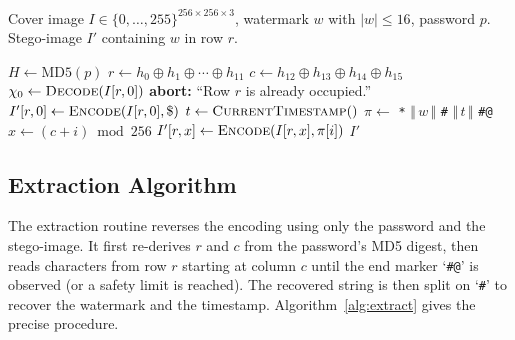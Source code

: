 \begin{algorithm}[H]
    \RaggedRight
    \caption{Row-based LSB watermark embedding}
    \label{alg:embed}
    \algorithmicrequire \quad Cover image $I \in \{0,\ldots,255\}^{256 \times 256 \times 3}$, watermark $w$ with $|w| \le 16$, password $p$. \\
    \algorithmicensure \quad Stego-image $I'$ containing $w$ in row $r$.

    \begin{algorithmic}[1]
        \State $H \gets \mathrm{MD5}(p)$
        \State $r \gets h_0 \oplus h_1 \oplus \cdots \oplus h_{11}$ 
        \State $c \gets h_{12} \oplus h_{13} \oplus h_{14} \oplus h_{15}$ 
        \State $\chi_0 \gets \textsc{Decode}(I[r, 0])$
            \State \textbf{abort:} ``Row $r$ is already occupied.''
        \EndIf
        \State $I'[r, 0] \gets \textsc{Encode}(I[r, 0], \mathtt{\$})$ 
        \State $t \gets \textsc{CurrentTimestamp}()$
        \State $\pi \gets$ \texttt{*} $\Vert\, w \,\Vert$ \texttt{\#} $\Vert\, t \,\Vert$ \texttt{\#@}
            \State $x \gets (c + i) \bmod 256$
            \State $I'[r, x] \gets \textsc{Encode}(I[r, x], \pi[i])$ 
        \EndFor
        \State \Return $I'$
    \end{algorithmic}
\end{algorithm}

\subsection{Extraction Algorithm}

The extraction routine reverses the encoding using only the password and the stego-image. It first re-derives $r$ and $c$ from the password's MD5 digest, then reads characters from row $r$ starting at column $c$ until the end marker `\texttt{\#@}' is observed (or a safety limit is reached). The recovered string is then split on `\texttt{\#}' to recover the watermark and the timestamp. Algorithm~\ref{alg:extract} gives the precise procedure.

